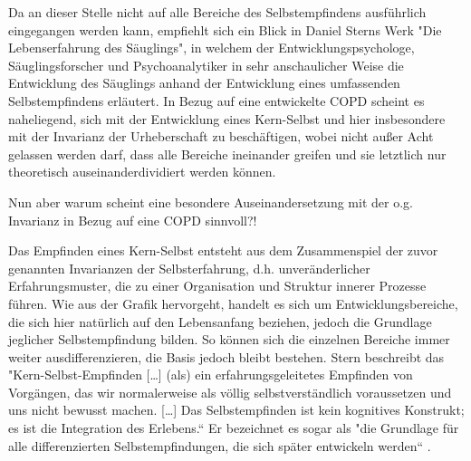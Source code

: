 Da an dieser Stelle nicht auf alle Bereiche des Selbstempfindens ausführlich eingegangen werden kann, empfiehlt sich ein Blick in Daniel Sterns Werk "Die Lebenserfahrung des Säuglings", in welchem der Entwicklungspsychologe, Säuglingsforscher und Psychoanalytiker in sehr anschaulicher Weise die Entwicklung des Säuglings anhand der Entwicklung eines umfassenden Selbstempfindens erläutert.
In Bezug auf eine entwickelte COPD scheint es naheliegend, sich mit der Entwicklung eines Kern-Selbst und hier insbesondere mit der Invarianz der Urheberschaft zu beschäftigen, wobei nicht außer Acht gelassen werden darf, dass alle Bereiche ineinander greifen und sie letztlich nur theoretisch auseinanderdividiert werden können.

Nun aber warum scheint eine besondere Auseinandersetzung mit der o.g. Invarianz in Bezug auf eine COPD sinnvoll?!

Das Empfinden eines Kern-Selbst entsteht aus dem Zusammenspiel der zuvor genannten Invarianzen der Selbsterfahrung, d.h. unveränderlicher Erfahrungsmuster, die zu einer Organisation und Struktur innerer Prozesse führen. Wie aus der Grafik hervorgeht, handelt es sich um Entwicklungsbereiche, die sich hier natürlich auf den Lebensanfang beziehen, jedoch die Grundlage jeglicher Selbstempfindung bilden. So können sich die einzelnen Bereiche immer weiter ausdifferenzieren, die Basis jedoch bleibt bestehen. 
Stern beschreibt das "Kern-Selbst-Empfinden […] (als) ein erfahrungsgeleitetes Empfinden von Vorgängen, das wir normalerweise als völlig selbstverständlich voraussetzen und uns nicht bewusst machen. […] Das Selbstempfinden ist kein kognitives Konstrukt; es ist die Integration des Erlebens.“ \autocite[106f.]{stern2007} Er bezeichnet es sogar als "die Grundlage für alle differenzierten Selbstempfindungen, die sich später entwickeln werden“ \autocite[106f.]{stern2007}. 

